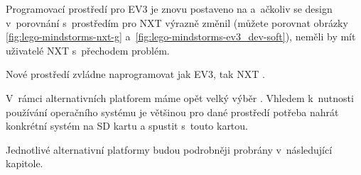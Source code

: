 Programovací prostředí pro EV3 je znovu postaveno na \labview{ }a~ačkoliv se design v~porovnání s~prostředím pro NXT výrazně změnil (můžete porovnat obrázky \ref{fig:lego-mindstorms-nxt-g} a~\ref{fig:lego-mindstorms-ev3_dev-soft}), neměli by mít uživatelé NXT s~přechodem problém. 

Nové prostředí zvládne naprogramovat jak EV3, tak NXT \brick{}.


V~rámci alternativních platforem máme opět velký výběr \cite{legoMindstormsWikipedia_programming-languages}. 
Vhledem k~nutnosti používání operačního systému je většinou pro dané prostředí potřeba nahrát konkrétní systém na SD kartu a spustit \brick{ }s~touto kartou.

Jednotlivé alternativní platformy budou podrobněji probrány v~následující kapitole.
